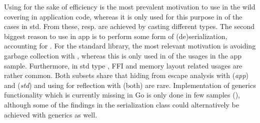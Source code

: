 
Using \unsafe{} for the sake of efficiency is the most prevalent motivation to use \unsafe{} in the wild covering  in application code, whereas it is only used for this purpose in  of the cases in std. 
From these,  resp.  are achieved by casting different types. 
The second biggest reason to use \unsafe{} in app is to perform some form of (de)serialization, accounting for .
For the standard library, the most relevant motivation is avoiding garbage collection with , whereas this is only used in  of the usages in the app sample.
Furthermore, in std type , FFI  and memory layout  related \unsafe{} usages are rather common.
Both subsets share that hiding from escape analysis with  (\textit{app}) and  (\textit{std}) and using \unsafe{} for reflection with  (both) are rare.
Implementation of generics functionality which is currently missing in Go is only done in few samples (), although some of the findings in the serialization class could alternatively be achieved with generics as well.


